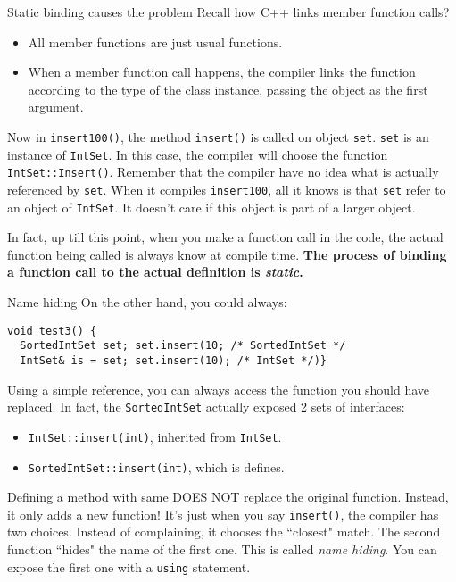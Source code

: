 \begin{frame}[fragile]{Static binding causes the problem}
Recall how C++ links member function calls?
\begin{itemize}
	\item All member functions are just usual functions.
	\item When a member function call happens, the compiler links the function according to the type of the class instance, passing the object as the first argument. 
\end{itemize}

Now in \texttt{insert100()}, the method  \texttt{insert()} is called on object \texttt{set}. \texttt{set} is an instance of \texttt{IntSet}. In this case, the compiler will choose the function \texttt{IntSet::Insert()}. 
Remember that the compiler have no idea what is actually referenced by \texttt{set}. When it compiles \texttt{insert100}, all it knows is that \texttt{set} refer to an object of \texttt{IntSet}. It doesn't care if this object is part of a larger object. 

In fact, up till this point, when you make a function call in the code, the actual function being called is always know at compile time. \textbf{The process of binding a function call to the actual definition is \textit{static}. }
\end{frame}

\begin{frame}[fragile]{Name hiding}
On the other hand, you could always:
\begin{verbatim}
void test3() {
  SortedIntSet set; set.insert(10; /* SortedIntSet */
  IntSet& is = set; set.insert(10); /* IntSet */)}
\end{verbatim}

Using a simple reference, you can always access the function you should have replaced. In fact, the \texttt{SortedIntSet} actually exposed 2 sets of interfaces:
\begin{itemize}
	\item \texttt{IntSet::insert(int)}, inherited from \texttt{IntSet}.
	\item \texttt{SortedIntSet::insert(int)}, which is defines.
\end{itemize}

Defining a method with same DOES NOT replace the original function. Instead, it only adds a new function! It's just when you say \texttt{insert()}, the compiler has two choices. Instead of complaining,   it chooses the ``closest" match. The second function ``hides" the name of the first one. This is called \textit{name hiding}. You can expose the first one with a \texttt{using} statement.
\end{frame}

